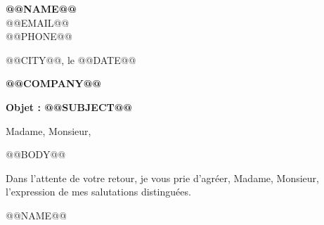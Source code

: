 \documentclass[11pt,a4paper]{article}
\begin{document}
\textbf{@@NAME@@}\\
@@EMAIL@@\\
@@PHONE@@

\hfill @@CITY@@, le @@DATE@@

\vspace{12pt}
\begin{flushright}
\textbf{@@COMPANY@@}
\end{flushright}

\vspace{12pt}
\textbf{Objet : @@SUBJECT@@}

Madame, Monsieur,

@@BODY@@

Dans l'attente de votre retour, je vous prie d'agréer, Madame, Monsieur, l'expression de mes salutations distinguées.

\vspace{12pt}
@@NAME@@
\end{document}
